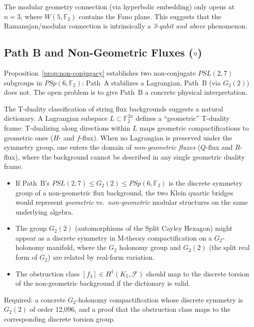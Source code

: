 \documentclass[11pt,a4paper]{article}
\theoremstyle{remark}
\newcommand{\F}{\mathbb{F}}
\newcommand{\cF}{\mathcal{F}}
\begin{document}
The modular geometry connection (via hyperbolic embedding) only opens
at $n=3$, where $W(5, \F_2)$ contains the Fano plane. This suggests
that the Ramanujan/modular connection is intrinsically a \emph{3-qubit
and above} phenomenon.

\subsection{Path B and Non-Geometric Fluxes ($\circ$)}
\label{sec:pathb-physics}

Proposition~\ref{prop:non-conjugacy} establishes two non-conjugate
$PSL(2,7)$ subgroups in $PSp(6, \F_2)$: Path~A stabilizes a Lagrangian,
Path~B (via $G_2(2)$) does not. The open problem is to give Path~B
a concrete physical interpretation.

The T-duality classification of string flux backgrounds suggests a
natural dictionary. A Lagrangian subspace $L \subset \F_2^{2n}$ defines
a ``geometric'' T-duality frame: T-dualizing along directions within $L$
maps geometric compactifications to geometric ones ($H$- and $f$-flux).
When no Lagrangian is preserved under the symmetry group, one enters
the domain of \emph{non-geometric fluxes} ($Q$-flux and $R$-flux),
where the background cannot be described in any single geometric duality
frame.

\begin{itemize}
  \item If Path~B's $PSL(2,7) \leq G_2(2) \leq PSp(6, \F_2)$ is the
    discrete symmetry group of a non-geometric flux background, the two
    Klein quartic bridges would represent \emph{geometric} vs.\
    \emph{non-geometric} modular structures on the same underlying algebra.
  \item The group $G_2(2)$ (automorphisms of the Split Cayley Hexagon)
    might appear as a discrete symmetry in M-theory compactification on
    a $G_2$-holonomy manifold, where the $G_2$ holonomy group and
    $G_2(2)$ (the split real form of $G_2$) are related by real-form
    variation.
  \item The obstruction class $[f_3] \in H^1(K_5, \cF)$ should map to
    the discrete torsion of the non-geometric background if the
    dictionary is valid.
\end{itemize}

Required: a concrete $G_2$-holonomy compactification whose discrete
symmetry is $G_2(2)$ of order 12{,}096, and a proof that the
obstruction class maps to the corresponding discrete torsion group.
\end{document}
